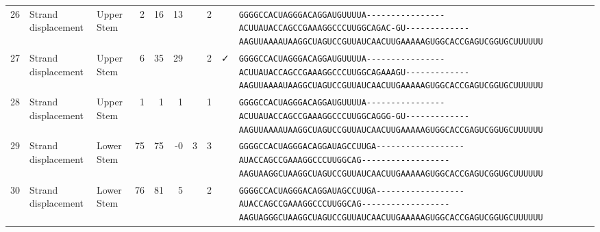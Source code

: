 \begin{tabular}{rllrrrrrcl}
 26 & Strand displacement & Upper Stem & 2 & 16 & 13 &  & 2 &  &
 \color{ucsfdarkgrey}\verb|GGGGCCACUAGGGACAGGAU|\color{ucsforange}\verb|GUUUUA|\color{ucsfblue}\verb|----------------ACUU|\color{ucsfpurple}\verb|AUACCAGCCGAAAGGCCCUUGGCAG|\color{ucsfblue}\verb|AC-GU-------------AAGU|\color{ucsforange}\verb|UAAAAUAA|\color{ucsfnavy}\verb|GGCUAGUCC|\color{ucsforange}\verb|GUUAUCA|\color{ucsfteal}\verb|ACUUGAAAAAGU|\color{ucsforange}\verb|GGCACCGAGUCGGUGCUUUUUU| \\

 27 & Strand displacement & Upper Stem & 6 & 35 & 29 &  & 2 & ✓ &
 \color{ucsfdarkgrey}\verb|GGGGCCACUAGGGACAGGAU|\color{ucsforange}\verb|GUUUUA|\color{ucsfblue}\verb|----------------ACUU|\color{ucsfpurple}\verb|AUACCAGCCGAAAGGCCCUUGGCAG|\color{ucsfblue}\verb|AAAGU-------------AAGU|\color{ucsforange}\verb|UAAAAUAA|\color{ucsfnavy}\verb|GGCUAGUCC|\color{ucsforange}\verb|GUUAUCA|\color{ucsfteal}\verb|ACUUGAAAAAGU|\color{ucsforange}\verb|GGCACCGAGUCGGUGCUUUUUU| \\

 28 & Strand displacement & Upper Stem & 1 & 1 & 1 &  & 1 &  &
 \color{ucsfdarkgrey}\verb|GGGGCCACUAGGGACAGGAU|\color{ucsforange}\verb|GUUUUA|\color{ucsfblue}\verb|----------------ACUU|\color{ucsfpurple}\verb|AUACCAGCCGAAAGGCCCUUGGCAG|\color{ucsfblue}\verb|GG-GU-------------AAGU|\color{ucsforange}\verb|UAAAAUAA|\color{ucsfnavy}\verb|GGCUAGUCC|\color{ucsforange}\verb|GUUAUCA|\color{ucsfteal}\verb|ACUUGAAAAAGU|\color{ucsforange}\verb|GGCACCGAGUCGGUGCUUUUUU| \\

 29 & Strand displacement & Lower Stem & 75 & 75 & -0 & 3 & 3 &  &
 \color{ucsfdarkgrey}\verb|GGGGCCACUAGGGACAGGAU|\color{ucsforange}\verb|AGCCUU|\color{ucsfblue}\verb|GA------------------|\color{ucsfpurple}\verb|AUACCAGCCGAAAGGCCCUUGGCAG|\color{ucsfblue}\verb|------------------AAGU|\color{ucsforange}\verb|AAGGCUAA|\color{ucsfnavy}\verb|GGCUAGUCC|\color{ucsforange}\verb|GUUAUCA|\color{ucsfteal}\verb|ACUUGAAAAAGU|\color{ucsforange}\verb|GGCACCGAGUCGGUGCUUUUUU| \\

 30 & Strand displacement & Lower Stem & 76 & 81 & 5 &  & 2 &  &
 \color{ucsfdarkgrey}\verb|GGGGCCACUAGGGACAGGAU|\color{ucsforange}\verb|AGCCUU|\color{ucsfblue}\verb|GA------------------|\color{ucsfpurple}\verb|AUACCAGCCGAAAGGCCCUUGGCAG|\color{ucsfblue}\verb|------------------AAGU|\color{ucsforange}\verb|AGGGCUAA|\color{ucsfnavy}\verb|GGCUAGUCC|\color{ucsforange}\verb|GUUAUCA|\color{ucsfteal}\verb|ACUUGAAAAAGU|\color{ucsforange}\verb|GGCACCGAGUCGGUGCUUUUUU| \\


\end{tabular}
